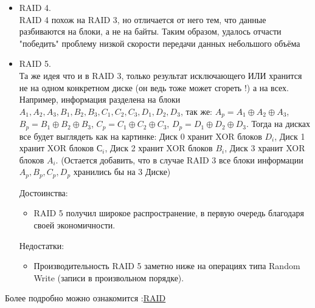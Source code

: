 \begin {itemize}
\begin{figure}[h!]
\begin{minipage}[h]{0.3\linewidth}
\end{minipage}
\hfill
\begin{minipage}[h]{0.3\linewidth}
\end{minipage}
\end{figure}


\item RAID 4. \\
RAID 4 похож на RAID 3, но отличается от него тем, что данные разбиваются на блоки, а не на байты. Таким образом, удалось отчасти "победить" проблему низкой скорости передачи данных небольшого объёма

\item RAID 5. \\
Та же идея что и в RAID 3, только результат исключающего ИЛИ хранится не на одном конкретном диске (он ведь тоже может сгореть !) а на всех. Например, информация разделена на блоки \\ $A_1, A_2, A_3, B_1, B_2, B_3, C_1, C_2, C_3, D_1, D_2, D_3$, так же:
$A_p = A_1 \oplus A_2 \oplus A_3$, 
$B_p = B_1 \oplus B_2 \oplus B_3$, $C_p = C_1 \oplus C_2 \oplus C_3$, $D_p = D_1 \oplus D_2 \oplus D_3$. Тогда на дисках все будет выглядеть как на картинке: Диск 0 хранит XOR блоков $D_i$, Диск 1 хранит XOR блоков $С_i$, Диск 2 хранит XOR блоков $B_i$, Диск 3 хранит XOR блоков $A_i$. (Остается добавить, что в случае RAID 3 все блоки информации $A_p, B_p, C_p, D_p$ хранились бы на 3 Диске)

Достоинства:
\begin {itemize}
\item RAID 5 получил широкое распространение, в первую очередь благодаря своей экономичности. 
\end {itemize}

Недостатки:
\begin {itemize}
\item Производительность RAID 5 заметно ниже на операциях типа Random Write (записи в произвольном порядке).
\end {itemize}
\end {itemize}
Более подробно можно ознакомится :\href{https://ru.wikipedia.org/wiki/RAID}{RAID}

